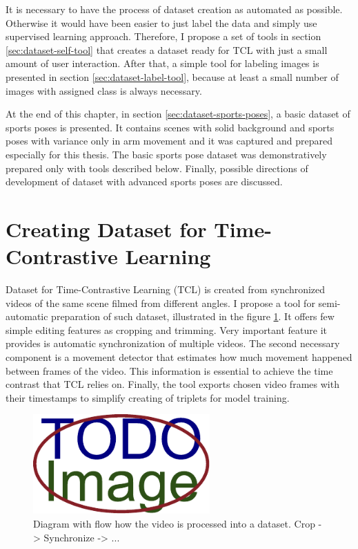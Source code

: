 It is necessary to have the process of dataset creation as automated as possible. Otherwise it would have been easier to just label the data and simply use supervised learning approach. Therefore, I propose a set of tools in section \ref{sec:dataset-self-tool} that creates a dataset ready for TCL with just a small amount of user interaction. After that, a simple tool for labeling images is presented in section \ref{sec:dataset-label-tool}, because at least a small number of images with assigned class is always necessary.

At the end of this chapter, in section \ref{sec:dataset-sports-poses}, a basic dataset of sports poses is presented. It contains scenes with solid background and sports poses with variance only in arm movement and it was captured and prepared especially for this thesis. The basic sports pose dataset was demonstratively prepared only with tools described below. Finally, possible directions of development of dataset with advanced sports poses are discussed.

\section{\label{sec:dataset-self-tool}Creating Dataset for Time-Contrastive Learning}

Dataset for Time-Contrastive Learning (TCL) is created from synchronized videos of the same scene filmed from different angles. I propose a tool for semi-automatic preparation of such dataset, illustrated in the figure \ref{fig:dataset-preparation}. It offers few simple editing features as cropping and trimming. Very important feature it provides is automatic synchronization of multiple videos. The second necessary component is a movement detector that estimates how much movement happened between frames of the video. This information is essential to achieve the time contrast that TCL relies on. Finally, the tool exports chosen video frames with their timestamps to simplify creating of triplets for model training.

\begin{figure}[ht]
    \centering
    \includegraphics[width=\linewidth,height=1.5in]{figures/placeholder.pdf}
    \caption{Diagram with flow how the video is processed into a dataset. Crop -> Synchronize -> ...}
    \label{fig:dataset-preparation}
\end{figure}

